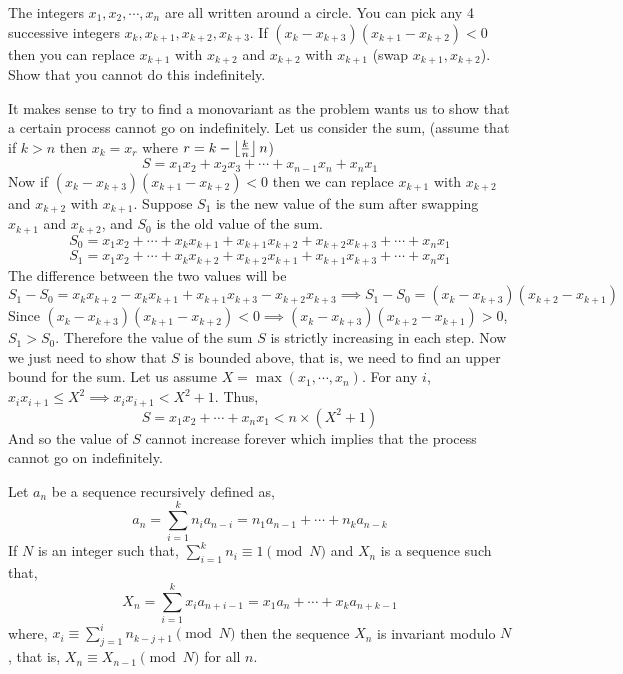 \begin{problem}
    The integers $x_{1}, x_{2}, \cdots, x_{n}$ are all written around a circle. 
    You can pick any 4 successive integers $x_{k}, x_{k+1}, x_{k+2}, x_{k+3}$. 
    If $(x_{k} - x_{k+3})(x_{k+1} - x_{k+2}) < 0$ then 
    you can replace $x_{k+1}$ with $x_{k+2}$ and $x_{k+2}$ with $x_{k+1}$ (swap $x_{k+1},x_{k+2}$). 
    Show that you cannot do this indefinitely.
\end{problem}
\begin{sol}
    It makes sense to try to find a monovariant as the problem wants us to 
    show that a certain process cannot go on indefinitely. Let us consider 
    the sum, 
    (assume that if $k > n$ then $x_{k} = x_{r}$ where $r = k - \left\lfloor \frac{k}{n} \right\rfloor n$)
    \[
        S = x_{1}x_{2} + x_{2}x_{3} + \cdots + x_{n-1}x_{n} + x_{n}x_{1}
    \]
    Now if $(x_{k} - x_{k+3})(x_{k+1} - x_{k+2}) < 0$ then we can replace 
    $x_{k+1}$ with $x_{k+2}$ and $x_{k+2}$ with $x_{k+1}$. Suppose $S_{1}$ 
    is the new value of the sum after swapping $x_{k+1}$ and $x_{k+2}$, and $S_{0}$ 
    is the old value of the sum.
    \[
        S_{0} = x_{1}x_{2} + \cdots + x_{k}x_{k+1} + x_{k+1}x_{k+2} + x_{k+2}x_{k+3} + \cdots + x_{n}x_{1}
    \]
    \[
        S_{1} = x_{1}x_{2} + \cdots + x_{k}x_{k+2} + x_{k+2}x_{k+1} + x_{k+1}x_{k+3} + \cdots + x_{n}x_{1}
    \]
    The difference between the two values will be 
    \[
        S_{1} - S_{0} = x_{k}x_{k+2} - x_{k}x_{k+1} + x_{k+1}x_{k+3} - x_{k+2}x_{k+3} 
        \implies S_{1} - S_{0} = (x_{k} - x_{k+3})(x_{k+2} - x_{k+1})
    \]
    Since $(x_{k} - x_{k+3})(x_{k+1} - x_{k+2}) < 0 \implies (x_{k} - x_{k+3})(x_{k+2} - x_{k+1}) > 0$, 
    $S_{1} > S_{0}$. Therefore the value of the sum $S$ is strictly increasing in each step. 
    Now we just need to show that $S$ is bounded above, that is, we need to find an upper bound 
    for the sum. Let us assume $X = \max(x_{1}, \cdots, x_{n})$. 
    For any $i$, $x_{i}x_{i+1} \leq X^{2} \implies x_{i}x_{i+1} < X^{2} + 1$. Thus,
    \[
        S = x_{1}x_{2} + \cdots + x_{n}x_{1} < n \times (X^{2} + 1)
    \]
    And so the value of $S$ cannot increase forever which implies that the process cannot go on indefinitely.
\end{sol}
\begin{proposition}
    Let $a_{n}$ be a sequence recursively defined as,
    \[
        a_{n} = \sum_{i=1}^{k} n_{i} a_{n-i} = n_{1} a_{n-1} + \cdots + n_{k} a_{n-k}
    \]
    If $N$ is an integer such that, $\sum_{i=1}^{k} n_{i} \equiv 1 \pmod{N}$ and 
    $X_{n}$ is a sequence such that,
    \[
        X_{n} = \sum_{i=1}^{k} x_{i} a_{n+i-1} = x_{1} a_{n} + \cdots + x_{k} a_{n+k-1}
    \]
    where, $x_{i} \equiv \sum_{j=1}^{i} n_{k-j+1} \pmod{N}$ then the sequence 
    $X_{n}$ is invariant modulo $N$, that is, $X_{n} \equiv X_{n-1} \pmod{N}$ 
    for all $n$.
\end{proposition}
